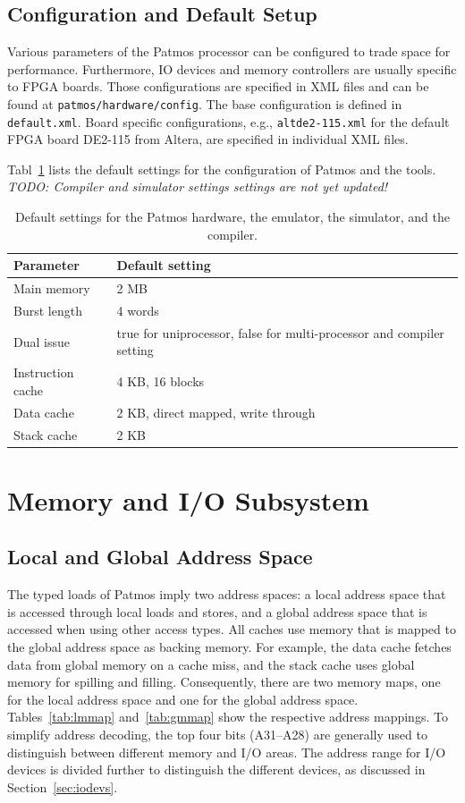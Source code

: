 \documentclass[a4paper,fontsize=10pt,twoside,DIV15,BCOR12mm,headinclude=true,footinclude=false,pagesize,bibtotoc]{scrbook}
\newcommand{\code}[1]{{\texttt{#1}}}
\newcommand{\todo}[1]{{\emph{TODO: #1}}}
\begin{document}
\section{Configuration and Default Setup}

Various parameters of the Patmos processor can be configured to trade
space for performance. Furthermore, IO devices and memory controllers
are usually specific to FPGA boards. Those configurations are specified in
XML files and can be found at \code{patmos/hardware/config}. The base
configuration is defined in \code{default.xml}. Board specific configurations,
e.g., \code{altde2-115.xml} for the default FPGA board DE2-115 from Altera,
are specified in individual XML files.

Tabl~\ref{tab:defaults} lists the default settings for the configuration of Patmos
and the tools. \todo{Compiler and simulator settings settings are not yet updated!}

\begin{table}
\centering
\begin{tabular}{ll}
\toprule
Parameter & Default setting \\
\midrule
Main memory & 2 MB \\
Burst length & 4 words \\
Dual issue & true for uniprocessor, false for multi-processor and compiler setting \\
Instruction cache & 4 KB, 16 blocks \\
Data cache & 2 KB, direct mapped, write through \\
Stack cache & 2 KB \\
\bottomrule
\end{tabular}
\caption{Default settings for the Patmos hardware, the emulator, the simulator, and the compiler.}
\label{tab:defaults}
\end{table}

\chapter{Memory and I/O Subsystem}
\label{chap:memsyst}

\section{Local and Global Address Space}

The typed loads of Patmos imply two address spaces: a local address
space that is accessed through local loads and stores, and a global
address space that is accessed when using other access types. All
caches use memory that is mapped to the global address space as
backing memory. For example, the data cache fetches data from global
memory on a cache miss, and the stack cache uses global memory for
spilling and filling. Consequently, there are two memory maps, one for
the local address space and one for the global address
space. Tables~\ref{tab:lmmap} and~\ref{tab:gmmap} show the respective
address mappings. To simplify address decoding, the top four bits
(A31--A28) are generally used to distinguish between different memory
and I/O areas. The address range for I/O devices is divided further to
distinguish the different devices, as discussed in
Section~\ref{sec:iodevs}.
\end{document}
